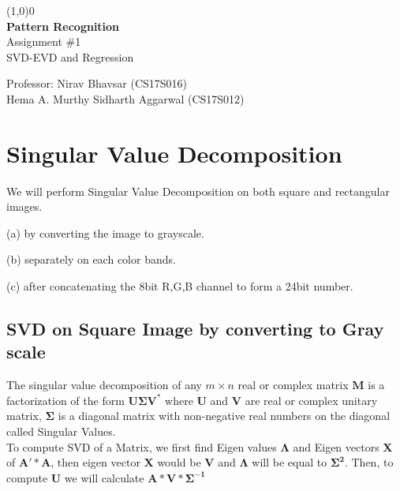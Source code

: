 \documentclass[12pt]{report}
\begin{document}
\begin{titlepage}
	\begin{center}
		\line(1,0){0}\\
		[4cm]
		\huge{\bfseries Pattern Recognition} \\
		[0.5cm]
		Assignment \#1 \\
		[0.5cm]
		\large{SVD-EVD and Regression} \\
		[10cm]
	\end{center}
	\begin{center}
		
			\Large{
			  Professor:  \hfill  Nirav Bhavsar (CS17S016)\\
		  Hema A. Murthy  \hfill  Sidharth Aggarwal (CS17S012)\\
			}
	
	
	\end{center}
	
\end{titlepage}

\tableofcontents
\thispagestyle{empty}
\cleardoublepage

\setcounter{page}{1}


\chapter{Singular Value Decomposition}

We will perform Singular Value Decomposition on both square and rectangular images.

(a) by converting the image to grayscale.

(b) separately on each color bands.

(c) after concatenating the 8bit R,G,B channel to form a 24bit number. 

\section{SVD on Square Image by converting to Gray scale}

The singular value decomposition of any $ m\times n $  real or complex matrix $ \mathbf  M $  is a factorization of the form  $ \mathbf{ U\Sigma V^{*} }$ where $ \mathbf {U} $ and $ \mathbf {V} $ are real or complex unitary matrix, $ \mathbf{\Sigma} $ is a diagonal matrix with non-negative real numbers on the diagonal called Singular Values.\\

To compute SVD of a Matrix, we first find Eigen values $\mathbf{\Lambda}$ and Eigen vectors $\mathbf{X}$ of $ \mathbf{A'*A} $, then eigen vector $\mathbf{X}$ would be $\mathbf{V}$ and  $\mathbf{\Lambda}$ will be equal to $\mathbf{\Sigma^{2}}$. Then, to compute $\mathbf{U}$ we will calculate $\mathbf{A*V*\Sigma^{-1}}$ \\
\end{document}
